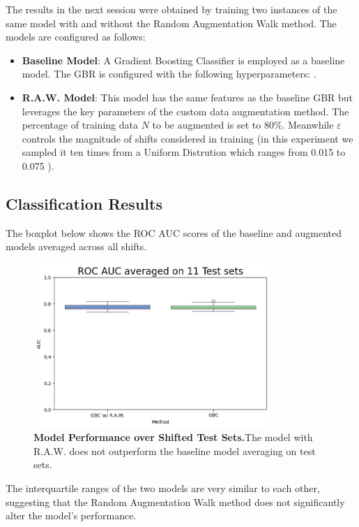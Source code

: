 The results in the next session were obtained by training two instances of the same model with and without the Random Augmentation Walk method. The models are configured as follows:
\begin{itemize}
    \item \textbf{Baseline Model}: A Gradient Boosting Classifier is employed as a baseline model. The GBR is configured with the following hyperparameters: .
    \item \textbf{R.A.W. Model}: This model has the same features as the baseline GBR but leverages the key parameters of the custom data augmentation method. The percentage of training data $N$ to be augmented is set to 80\%. Meanwhile $\varepsilon$ controls the magnitude of shifts considered in training (in this experiment we sampled it ten times from a Uniform Distrution which ranges from 0.015 to 0.075 ).
\end{itemize}

\subsection{Classification Results}


The boxplot below shows the ROC AUC scores of the baseline and augmented models averaged across all shifts.

\begin{figure}[H]
    \centering
    \includegraphics[width=0.8\textwidth]{assets/RealRaw11.png} 
    \caption{\textbf{Model Performance over Shifted Test Sets.}The model with R.A.W. does not outperform the baseline model averaging on test sets.}
\end{figure}

The interquartile ranges of the two models are very similar to each other, suggesting that the Random Augmentation Walk method does not significantly alter the model's performance.


